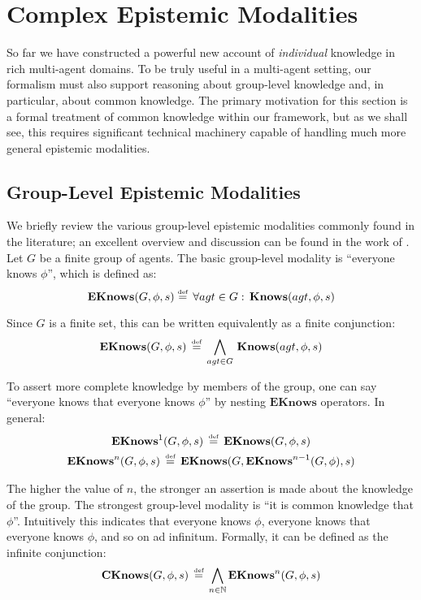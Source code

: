 

\chapter{Complex Epistemic Modalities}

\label{ch:cknowledge}

So far we have constructed a powerful new account of \emph{individual}
knowledge in rich multi-agent domains. To be truly useful in a multi-agent
setting, our formalism must also support reasoning about group-level
knowledge and, in particular, about common knowledge. The primary
motivation for this section is a formal treatment of common knowledge
within our framework, but as we shall see, this requires significant
technical machinery capable of handling much more general epistemic
modalities.


\section{Group-Level Epistemic Modalities}

We briefly review the various group-level epistemic modalities commonly
found in the literature; an excellent overview and discussion can
be found in the work of \citet{halpern90knowledge_distrib}. Let $G$
be a finite group of agents. The basic group-level modality is {}``everyone
knows $\phi$'', which is defined as:\[
\mathbf{EKnows}(G,\phi,s)\stackrel{\mbox{\tiny def}}{=}\,\forall agt\in G:\,\mathbf{Knows}(agt,\phi,s)\]


Since $G$ is a finite set, this can be written equivalently as a
finite conjunction:\[
\mathbf{EKnows}(G,\phi,s)\,\stackrel{\mbox{\tiny def}}{=}\,\bigwedge_{agt\in G}\,\mathbf{Knows}(agt,\phi,s)\]


To assert more complete knowledge by members of the group, one can
say {}``everyone knows that everyone knows $\phi$'' by nesting
$\mathbf{EKnows}$ operators. In general:\begin{gather*}
\mathbf{EKnows}^{1}(G,\phi,s)\,\stackrel{\mbox{\tiny def}}{=}\,\mathbf{EKnows}(G,\phi,s)\\
\mathbf{EKnows}^{n}(G,\phi,s)\,\stackrel{\mbox{\tiny def}}{=}\,\mathbf{EKnows}(G,\mathbf{EKnows}^{n-1}(G,\phi),s)\end{gather*}


The higher the value of $n$, the stronger an assertion is made about
the knowledge of the group. The strongest group-level modality is
{}``it is common knowledge that $\phi$''. Intuitively this indicates
that everyone knows $\phi$, everyone knows that everyone knows $\phi$,
and so on ad infinitum. Formally, it can be defined as the infinite
conjunction:\[
\mathbf{CKnows}(G,\phi,s)\,\stackrel{\mbox{\tiny def}}{=}\,\bigwedge_{n\in\mathbb{N}}\mathbf{EKnows}^{n}(G,\phi,s)\]


